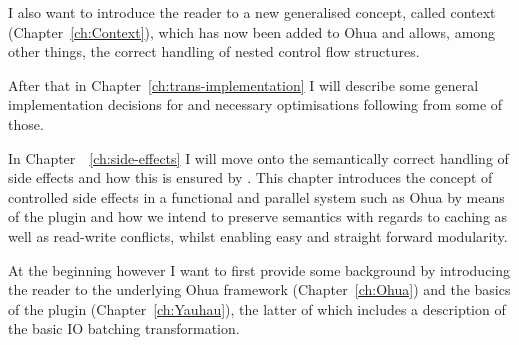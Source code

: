 I also want to introduce the reader to a new generalised concept, called context (Chapter~\ref{ch:Context}), which has now been added to Ohua and allows, among other things, the correct handling of nested control flow structures.

After that in Chapter~\ref{ch:trans-implementation} I will describe some general implementation decisions for \yauhau{} and necessary optimisations following from some of those.

In Chapter~~\ref{ch:side-effects} I will move onto the semantically correct handling of side effects and how this is ensured by \yauhau{}.
This chapter introduces the concept of controlled side effects in a functional and parallel system such as Ohua by means of the \yauhau{} plugin and how we intend to preserve semantics with regards to caching as well as read-write conflicts, whilst enabling easy and straight forward modularity.

At the beginning however I want to first provide some background by introducing the reader to the underlying Ohua framework (Chapter~\ref{ch:Ohua}) and the basics of the \yauhau{} plugin (Chapter~\ref{ch:Yauhau}), the latter of which includes a description of the basic IO batching transformation.
%

